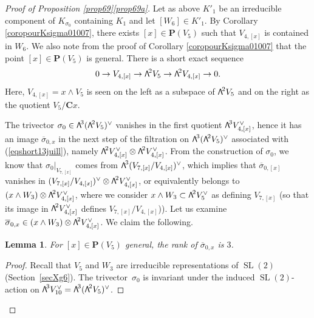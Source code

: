 \documentclass[11pt]{article}
\providecommand{\C}{}
\newtheorem{lemm}{Lemma}[section]
\theoremstyle{definition}
\renewcommand\C{{\mathbf C}}\let\CC\C
\renewcommand\P{{\mathbf P}}\let\PP\P
\let\dual\vee
\DeclareMathOperator{\SL}{SL}
\newcommand\bw[1]{{\hbox{\large$\mathsf{\Lambda}$}^{\!#1}}}
\begin{document}
\begin{proof}[Proof of Proposition \ref{prop69}\eqref{prop69a}]
Let as above $K'_1$ be an irreducible component of $K_{\sigma_0}$ containing $K_1$ and let $[W_6]\in K'_1$. By Corollary \ref{coropourKsigma01007}, there exists
$[x]\in\P(V_5)$ such that $V_{4,[x]}$ is contained in $W_6$. We also note from the proof of
Corollary \ref{coropourKsigma01007} that the point $[x]\in\P(V_5)$ is general.
There is a short exact sequence
\begin{equation}\label{eqshort13juill}
0\to V_{4,[x]}\to \bw2V_5\to \bw2V_{4,[x]}\to 0.
\end{equation}
Here, $V_{4,[x]}=x\wedge V_5$ is seen on the left as a subspace of $ \bw2V_5$ and on the right as the quotient $V_5/\C x$.

The trivector $\sigma_0\in\bw3(\bw2V_5)^\dual$ vanishes in the first quotient $\bw3V_{4,[x]}^\dual$, hence
it has an image $\overline{\sigma}_{0,x}$ in the next step of the filtration on $\bw3(\bw2V_5)^\dual$ associated with
(\ref{eqshort13juill}), namely $\bw2V_{4,[x]}^\dual\otimes \bw2V_{4,[x]}^\dual$.
From the construction of $\sigma_0$, we know that
$\sigma_0\vert_{V_{7,[x]}}$ comes from $\bw3(V_{7,[x]}/V_{4,[x]})^\dual$, which implies that
$\overline{\sigma}_{0,[x]}$ vanishes in $(V_{7,[x]}/V_{4,[x]})^\dual\otimes \bw2V_{4,[x]}^\dual$, or equivalently belongs
to $(x\wedge W_3)\otimes \bw2V_{4,[x]}^\dual$, where we consider $x\wedge W_3\subset \bw2V_{5}^\dual$ as defining $V_{7,[x]}$ (so that its image in $\bw2V_{4,[x]}^\dual$ defines
$V_{7,[x]}/V_{4,[x]}$)).
Let us examine $\overline{\sigma}_{0,x}\in(x\wedge W_3)\otimes \bw2V_{4,[x]}^\dual$. We claim
the following.

\begin{lemm} \label{lerankdesigma0x}
For $[x]\in\P(V_5)$ general, the rank of $\overline{\sigma}_{0,x}$ is $3$.
\end{lemm}

\begin{proof} Recall that $V_5$ and $W_3$ are irreducible representations of $\SL(2)$ (Section~\ref{secXg6}). The trivector~$\sigma_0$ is invariant under the induced $\SL(2)$-action on $\bw3 V_{10}^\dual=\bw3(\bw2V_5)^\dual$.


\end{proof}
\end{proof}
\end{document}
